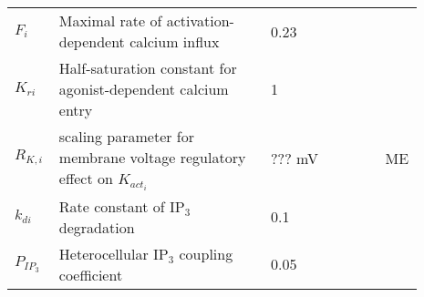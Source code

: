 \documentclass[fleqn]{report}
\numberwithin{equation}{section}
\numberwithin{equation}{section}
\begin{document}
 		\begin{table}[h!]
 		\centering
 		\begin{tabular}{ p{0.09\linewidth}  >{\footnotesize} p{0.5\linewidth}  >{\footnotesize} p{0.27\linewidth} >{\footnotesize} p{0.03\linewidth} }
 		\hline
 		 $F_{i}$      			& Maximal rate of activation-dependent calcium influx			& 0.23 \uMps				& \cite{Koenigsberger2006} \\
 		$K_{ri}$				& Half-saturation constant for agonist-dependent calcium entry	& 1 \uM					& \cite{Koenigsberger2006} \\
 		$R_{K,i}$				& scaling parameter for membrane voltage regulatory effect on $K_{act_{i}}$	& ???   mV					&   ME \\
 		$k_{di}$      			& Rate constant of IP$_{3}$ degradation	& 0.1 \pers	&\cite{Koenigsberger2006} \\
 		 		$P_{IP_{3}}$      		& Heterocellular IP$_{3}$ coupling coefficient	& 0.05 \pers	&  \cite{Koenigsberger2006} \\
 		\hline
 		\end{tabular}
 		\label{tab:IP3i}
 		\end{table}
 		
\end{document}
